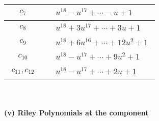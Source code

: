 \documentclass[1p]{elsarticle_modified}
\theoremstyle{definition}
\begin{document}
\begin{tabular}{m{50pt}|m{274pt}}
\hline $$\begin{aligned}c_{7}\end{aligned}$$&$\begin{aligned}
&u^{18}- u^{17}+\cdots- u+1
\end{aligned}$\\
\hline $$\begin{aligned}c_{8}\end{aligned}$$&$\begin{aligned}
&u^{18}+3 u^{17}+\cdots+3 u+1
\end{aligned}$\\
\hline $$\begin{aligned}c_{9}\end{aligned}$$&$\begin{aligned}
&u^{18}+6 u^{16}+\cdots+12 u^2+1
\end{aligned}$\\
\hline $$\begin{aligned}c_{10}\end{aligned}$$&$\begin{aligned}
&u^{18}- u^{17}+\cdots+9 u^2+1
\end{aligned}$\\
\hline $$\begin{aligned}c_{11},c_{12}\end{aligned}$$&$\begin{aligned}
&u^{18}- u^{17}+\cdots+2 u+1
\end{aligned}$\\
\hline
\end{tabular}\\~\\
\newpage\renewcommand{\arraystretch}{1}
\flushleft \textbf{(v) Riley Polynomials at the component}\newline \\
\end{document}
